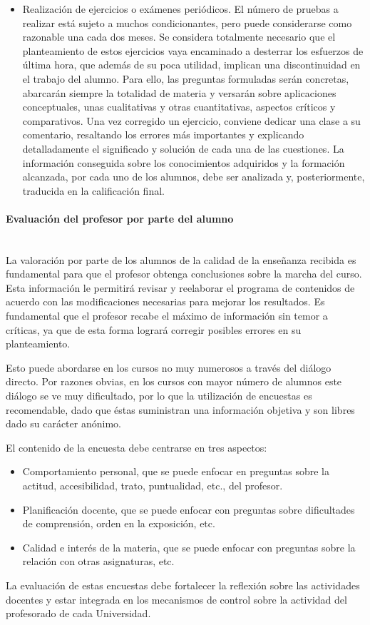 \begin{itemize}
\item	Realización de ejercicios o exámenes periódicos. El número de pruebas a realizar está sujeto a muchos condicionantes, pero puede considerarse como razonable una cada dos meses. Se considera totalmente necesario que el planteamiento de estos ejercicios vaya encaminado a desterrar los esfuerzos de última hora, que además de su poca utilidad, implican una discontinuidad en el trabajo del alumno. Para ello, las preguntas formuladas serán concretas, abarcarán siempre la totalidad de materia y versarán sobre aplicaciones conceptuales, unas cualitativas y otras cuantitativas, aspectos críticos y comparativos. Una vez corregido un ejercicio, conviene dedicar una clase a su comentario, resaltando los errores más importantes y explicando detalladamente el significado y solución de cada una de las cuestiones. La información conseguida sobre los conocimientos adquiridos y la formación alcanzada, por cada uno de los alumnos, debe ser analizada y, posteriormente, traducida en la calificación final.
\end{itemize}

\paragraph{Evaluación del profesor por parte del alumno\\\\}

La valoración por parte de los alumnos de la calidad de la enseñanza recibida es fundamental para que el profesor obtenga conclusiones sobre la marcha del curso. Esta información le permitirá revisar y reelaborar el programa de contenidos de acuerdo con las modificaciones necesarias para mejorar los resultados. Es fundamental que el profesor recabe el máximo de información sin temor a críticas, ya que de esta forma logrará corregir posibles errores en su planteamiento.

Esto puede abordarse en los cursos no muy numerosos a través del diálogo directo. Por razones obvias, en los cursos con mayor número de alumnos este diálogo se ve muy dificultado, por lo que la utilización de encuestas es recomendable, dado que éstas suministran una información objetiva y son libres dado su carácter anónimo.

El contenido de la encuesta debe centrarse en tres aspectos:
\begin{itemize}
\item Comportamiento personal, que se puede enfocar en preguntas sobre la actitud, accesibilidad, trato, puntualidad, etc., del profesor.
\item Planificación docente, que se puede enfocar con preguntas sobre dificultades de comprensión, orden en la exposición, etc.
\item Calidad e interés de la materia, que se puede enfocar con preguntas sobre la relación con otras asignaturas, etc.
\end{itemize}
La evaluación de estas encuestas debe fortalecer la reflexión sobre las actividades docentes y estar integrada en los mecanismos de control sobre la actividad del profesorado de cada Universidad.


